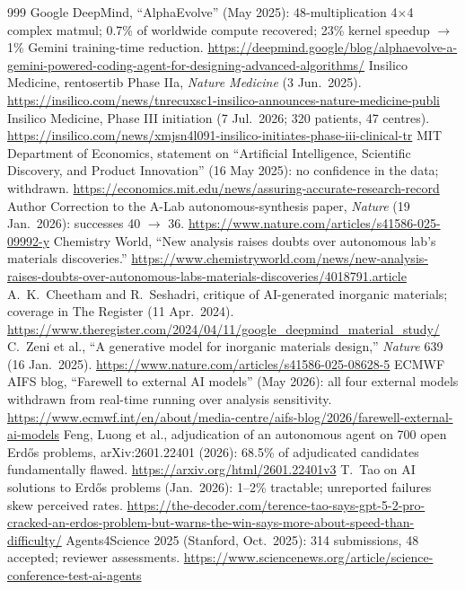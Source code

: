 \begin{thebibliography}{999}
 Google DeepMind, ``AlphaEvolve'' (May 2025): 48-multiplication 4$\times$4 complex matmul; 0.7\% of worldwide compute recovered; 23\% kernel speedup $\rightarrow$ 1\% Gemini training-time reduction. \url{https://deepmind.google/blog/alphaevolve-a-gemini-powered-coding-agent-for-designing-advanced-algorithms/}
 Insilico Medicine, rentosertib Phase IIa, \emph{Nature Medicine} (3 Jun.\ 2025). \url{https://insilico.com/news/tnrecuxsc1-insilico-announces-nature-medicine-publi}
 Insilico Medicine, Phase III initiation (7 Jul.\ 2026; 320 patients, 47 centres). \url{https://insilico.com/news/xmjsn4l091-insilico-initiates-phase-iii-clinical-tr}
 MIT Department of Economics, statement on ``Artificial Intelligence, Scientific Discovery, and Product Innovation'' (16 May 2025): no confidence in the data; withdrawn. \url{https://economics.mit.edu/news/assuring-accurate-research-record}
 Author Correction to the A-Lab autonomous-synthesis paper, \emph{Nature} (19 Jan.\ 2026): successes 40 $\rightarrow$ 36. \url{https://www.nature.com/articles/s41586-025-09992-y}
 Chemistry World, ``New analysis raises doubts over autonomous lab's materials discoveries.'' \url{https://www.chemistryworld.com/news/new-analysis-raises-doubts-over-autonomous-labs-materials-discoveries/4018791.article}
 A.~K.~Cheetham and R.~Seshadri, critique of AI-generated inorganic materials; coverage in The Register (11 Apr.\ 2024). \url{https://www.theregister.com/2024/04/11/google_deepmind_material_study/}
 C.~Zeni et al., ``A generative model for inorganic materials design,'' \emph{Nature} 639 (16 Jan.\ 2025). \url{https://www.nature.com/articles/s41586-025-08628-5}
 ECMWF AIFS blog, ``Farewell to external AI models'' (May 2026): all four external models withdrawn from real-time running over analysis sensitivity. \url{https://www.ecmwf.int/en/about/media-centre/aifs-blog/2026/farewell-external-ai-models}
 Feng, Luong et al., adjudication of an autonomous agent on 700 open Erd\H{o}s problems, arXiv:2601.22401 (2026): 68.5\% of adjudicated candidates fundamentally flawed. \url{https://arxiv.org/html/2601.22401v3}
 T.~Tao on AI solutions to Erd\H{o}s problems (Jan.\ 2026): 1--2\% tractable; unreported failures skew perceived rates. \url{https://the-decoder.com/terence-tao-says-gpt-5-2-pro-cracked-an-erdos-problem-but-warns-the-win-says-more-about-speed-than-difficulty/}
 Agents4Science 2025 (Stanford, Oct.\ 2025): 314 submissions, 48 accepted; reviewer assessments. \url{https://www.sciencenews.org/article/science-conference-test-ai-agents}

\end{thebibliography}
